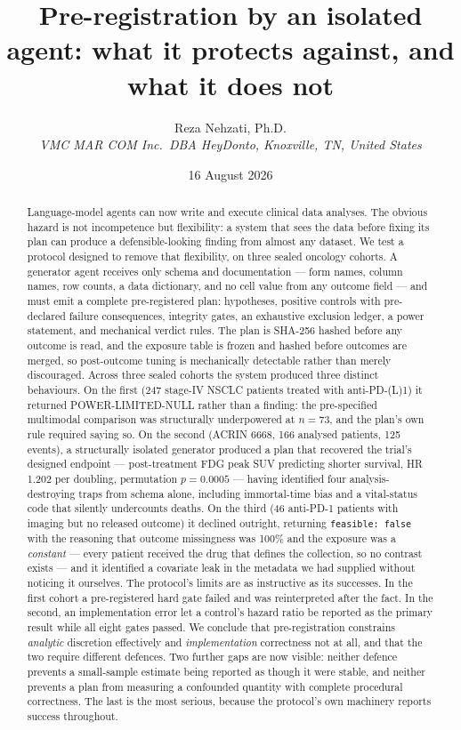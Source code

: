 \documentclass[11pt,a4paper]{article}
\title{\bfseries\color{qnavy} Pre-registration by an isolated agent: what it protects against,
and what it does not}
\author{Reza Nehzati, Ph.D.\\[2pt]
{\small\itshape VMC MAR COM Inc.\ DBA HeyDonto, Knoxville, TN, United States}}
\date{16 August 2026}
\begin{document}
\maketitle
\thispagestyle{empty}

\begin{abstract}
\noindent
Language-model agents can now write and execute clinical data analyses. The obvious hazard is not
incompetence but flexibility: a system that sees the data before fixing its plan can produce a
defensible-looking finding from almost any dataset. We test a protocol designed to remove that
flexibility, on three sealed oncology cohorts. A generator agent receives only schema and
documentation --- form names, column names, row counts, a data dictionary, and no cell value from
any outcome field --- and must emit a complete pre-registered plan: hypotheses, positive controls
with pre-declared failure consequences, integrity gates, an exhaustive exclusion ledger, a power
statement, and mechanical verdict rules. The plan is SHA-256 hashed before any outcome is read,
and the exposure table is frozen and hashed before outcomes are merged, so post-outcome tuning is
mechanically detectable rather than merely discouraged.
Across three sealed cohorts the system produced three distinct behaviours. On the first
(247 stage-IV NSCLC patients treated with anti-PD-(L)1) it returned POWER-LIMITED-NULL rather
than a finding: the pre-specified multimodal comparison was
structurally underpowered at $n = 73$, and the plan's own rule required saying so. On the second
(ACRIN 6668, 166 analysed patients, 125 events), a structurally isolated generator produced a plan
that recovered the trial's designed endpoint --- post-treatment FDG peak SUV predicting shorter
survival, HR 1.202 per doubling, permutation $p = 0.0005$ --- having identified four
analysis-destroying traps from schema alone, including immortal-time bias and a vital-status code
that silently undercounts deaths.
On the third (46 anti-PD-1 patients with imaging but no released outcome) it declined outright,
returning \texttt{feasible: false} with the reasoning that outcome missingness was 100\% and the
exposure was a \emph{constant} --- every patient received the drug that defines the collection, so
no contrast exists --- and it identified a covariate leak in the metadata we had supplied without
noticing it ourselves.
The protocol's limits are as instructive as its successes. In the first cohort a pre-registered
hard gate failed and was reinterpreted after the fact. In the second, an implementation error let
a control's hazard ratio be reported as the primary result while all eight gates passed. We
conclude that pre-registration constrains \emph{analytic} discretion effectively and
\emph{implementation} correctness not at all, and that the two require different defences. Two further
gaps are now visible: neither defence prevents a small-sample estimate being reported as though it
were stable, and neither prevents a plan from measuring a confounded quantity with complete
procedural correctness. The last is the most serious, because the protocol's own machinery reports
success throughout.
\end{abstract}
\end{document}
